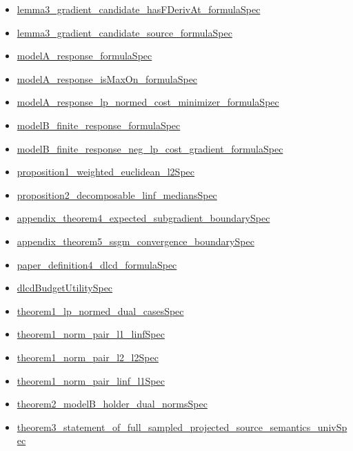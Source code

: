 \documentclass[10pt]{article}
\begin{document}
\begin{itemize}[leftmargin=1.2em]
\begin{itemize}[leftmargin=1.2em]
\item \hyperlink{source-claim-b6876f8d9704eca1}{lemma3\_gradient\_candidate\_hasFDerivAt\_formulaSpec}
\item \hyperlink{source-claim-086c0a9eaf7439f7}{lemma3\_gradient\_candidate\_source\_formulaSpec}
\item \hyperlink{source-claim-7c06ca676934c014}{modelA\_response\_formulaSpec}
\item \hyperlink{source-claim-2415911cc7314d54}{modelA\_response\_isMaxOn\_formulaSpec}
\item \hyperlink{source-claim-eab2a66508b56f30}{modelA\_response\_lp\_normed\_cost\_minimizer\_formulaSpec}
\item \hyperlink{source-claim-a9ebc621f1ff8c32}{modelB\_finite\_response\_formulaSpec}
\item \hyperlink{source-claim-057affe0833911ec}{modelB\_finite\_response\_neg\_lp\_cost\_gradient\_formulaSpec}
\item \hyperlink{source-claim-0bfa667fe6808e39}{proposition1\_weighted\_euclidean\_l2Spec}
\item \hyperlink{source-claim-732e45903404fd5e}{proposition2\_decomposable\_linf\_mediansSpec}
\item \hyperlink{source-claim-4f41e995c4d500c9}{appendix\_theorem4\_expected\_subgradient\_boundarySpec}
\item \hyperlink{source-claim-0f5dabcd51f758b4}{appendix\_theorem5\_ssgm\_convergence\_boundarySpec}
\item \hyperlink{source-claim-6ed3807a13e71f2b}{paper\_definition4\_dlcd\_formulaSpec}
\item \hyperlink{source-claim-9b6fb18f85b1c2c8}{dlcdBudgetUtilitySpec}
\item \hyperlink{source-claim-0c5fe9d4037e07b4}{theorem1\_lp\_normed\_dual\_casesSpec}
\item \hyperlink{source-claim-ef1266fd9eeea090}{theorem1\_norm\_pair\_l1\_linfSpec}
\item \hyperlink{source-claim-1ffdcf0343191a12}{theorem1\_norm\_pair\_l2\_l2Spec}
\item \hyperlink{source-claim-eab074ea3e4eb48e}{theorem1\_norm\_pair\_linf\_l1Spec}
\item \hyperlink{source-claim-8fdb269066d0c098}{theorem2\_modelB\_holder\_dual\_normsSpec}
\item \hyperlink{source-claim-970bf26e54daa2aa}{theorem3\_statement\_of\_full\_sampled\_projected\_source\_semantics\_univSpec}
\end{itemize}
\end{itemize}
\end{document}
